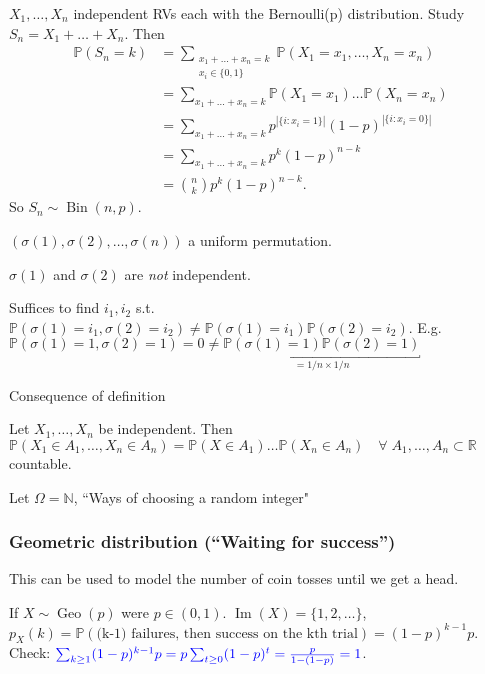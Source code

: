 \begin{example}
    $X_1, \dots, X_n$ independent RVs each with the Bernoulli(p) distribution.
    Study $S_n = X_1 + \dots + X_n$.
    Then 
    \begin{align*}
        \mathbb{P}(S_n = k) &= \sum_{\substack{x_1 + \dots + x_n = k \\ x_i \in \{0, 1\} }}\mathbb{P}(X_1 = x_1, \dots, X_n = x_n) \\
        &= \sum_{x_1 + \dots + x_n = k} \mathbb{P}(X_1 = x_1) \dots \mathbb{P}(X_n = x_n) \\
        &= \sum_{x_1 + \dots + x_n = k} p^{|\{i : x_i = 1\}|} (1 - p)^{|\{i : x_i = 0\}|} \\
        &= \sum_{x_1 + \dots + x_n = k} p^k (1-p)^{n - k} \\
        &= \binom{n}{k} p^k (1-p)^{n - k}.
    \end{align*} 
    So $S_n \sim \operatorname{Bin}(n, p)$.
\end{example} 

\begin{example}
    $(\sigma(1), \sigma(2), \dots, \sigma(n))$ a uniform permutation.
    \begin{claim}
        $\sigma(1)$ and $\sigma(2)$ are \emph{not} independent.
    \end{claim} 
    Suffices to find $i_1, i_2$ s.t. $\mathbb{P}(\sigma(1) = i_1, \sigma(2) = i_2) \neq \mathbb{P}(\sigma(1) = i_1) \mathbb{P}(\sigma(2) = i_2)$.
    E.g. $\mathbb{P}(\sigma(1) = 1, \sigma(2) = 1) = 0 \neq \underbracket{\mathbb{P}(\sigma(1) = 1) \mathbb{P}(\sigma(2) = 1)}_{= 1 / n \times 1 /n}$
\end{example} 

Consequence of definition

Let $X_1, \dots, X_n$ be independent.
Then $\mathbb{P}(X_1 \in A_1, \dots, X_n \in A_n) = \mathbb{P}(X \in A_1) \dots \mathbb{P}(X_n \in A_n) \quad \forall \; A_1, \dots, A_n \subset \mathbb{R}$ countable.

Let $\Omega = \mathbb{N}$, ``Ways of choosing a random integer"

\subsubsection{Geometric distribution (``Waiting for success'')}
This can be used to model the number of coin tosses until we get a head.

If $X \sim \operatorname{Geo}(p)$ were $p \in (0, 1)$.
$\operatorname{Im}(X) = \{1, 2, \dots\}$, \\
$p_X(k) = \mathbb{P}(\text{(k-1) failures, then success on the kth trial}) = (1-p)^{k-1}p$.
\color{blue} Check: $\mathcolor{blue}{\sum_{k \geq 1} (1-p)^{k - 1} p = p \sum_{t \geq 0} (1-p)^t = \frac{p}{1 - (1 - p)} = 1}$.\color{black}


